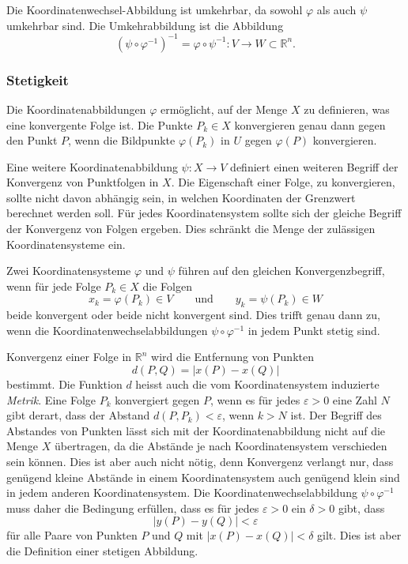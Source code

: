 
Die Koordinatenwechsel-Abbildung ist umkehrbar, da sowohl $\varphi$
als auch $\psi$ umkehrbar sind.
Die Umkehrabbildung ist die Abbildung
\[
(\psi\circ\varphi^{-1})^{-1}
=
\varphi\circ\psi^{-1}
\colon
V\to W \subset \mathbb{R}^n.
\]
%
%
\subsubsection{Stetigkeit}
Die Koordinatenabbildungen $\varphi$ ermöglicht, auf der Menge
$X$ zu definieren, was eine konvergente Folge ist.
Die Punkte $P_k\in X$ konvergieren genau dann gegen den Punkt $P$,
wenn die Bildpunkte $\varphi(P_k)$ in $U$ gegen $\varphi(P)$
konvergieren.

Eine weitere Koordinatenabbildung $\psi\colon X\to V$ definiert einen
weiteren Begriff der Konvergenz von Punktfolgen in $X$.
Die Eigenschaft einer Folge, zu konvergieren, sollte nicht davon 
abhängig sein, in welchen Koordinaten der Grenzwert berechnet
werden soll.
Für jedes Koordinatensystem sollte sich der gleiche Begriff der
Konvergenz von Folgen ergeben.
Dies schränkt die Menge der zulässigen Koordinatensysteme ein.

Zwei Koordinatensysteme $\varphi$ und $\psi$ führen auf den gleichen
Konvergenzbegriff, wenn für jede Folge $P_k\in X$ die Folgen
\[
x_k=\varphi(P_k)\in V
\qquad\text{und}\qquad
y_k=\psi(P_k)\in W
\]
beide konvergent oder beide nicht konvergent sind.
Dies trifft genau dann zu, wenn die Koordinatenwechselabbildungen
$\psi\circ\varphi^{-1}$ in jedem Punkt stetig sind.

Konvergenz einer Folge in $\mathbb{R}^n$ wird die Entfernung von Punkten 
\[
d(P,Q)
=
|x(P)-x(Q)|
\]
bestimmt.
Die Funktion $d$ heisst auch die vom Koordinatensystem induzierte 
{\em Metrik}.
%
Eine Folge $P_k$ konvergiert gegen $P$, wenn es für jedes $\varepsilon>0$
eine Zahl $N$ gibt derart, dass der Abstand $d(P,P_k)<\varepsilon$, wenn
$k>N$ ist.
Der Begriff des Abstandes von Punkten lässt sich mit der Koordinatenabbildung
nicht auf die Menge $X$ übertragen, da die Abstände je nach Koordinatensystem
verschieden sein können.
Dies ist aber auch nicht nötig, denn Konvergenz verlangt nur, dass genügend
kleine Abstände in einem Koordinatensystem auch genügend klein sind in jedem
anderen Koordinatensystem.
Die Koordinatenwechselabbildung $\psi\circ\varphi^{-1}$  muss daher die
Bedingung erfüllen, dass es für jedes $\varepsilon>0$ ein $\delta>0$ gibt,
dass 
\[
|y(P)-y(Q)| < \varepsilon
\]
für alle Paare von Punkten $P$ und $Q$ mit $|x(P)-x(Q)| < \delta$
gilt.
Dies ist aber die Definition einer stetigen Abbildung.

